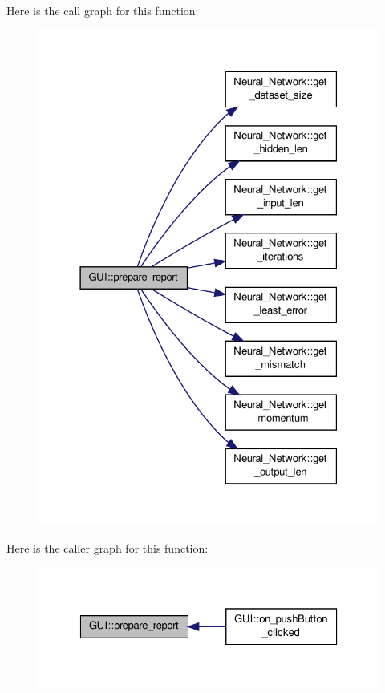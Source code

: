 Here is the call graph for this function\-:
\nopagebreak
\begin{figure}[H]
\begin{center}
\leavevmode
\includegraphics[width=328pt]{d7/d46/a00002_a4b4725862e2fb5a2ffd6ebc0a88c096c_cgraph}
\end{center}
\end{figure}




Here is the caller graph for this function\-:\nopagebreak
\begin{figure}[H]
\begin{center}
\leavevmode
\includegraphics[width=326pt]{d7/d46/a00002_a4b4725862e2fb5a2ffd6ebc0a88c096c_icgraph}
\end{center}
\end{figure}


